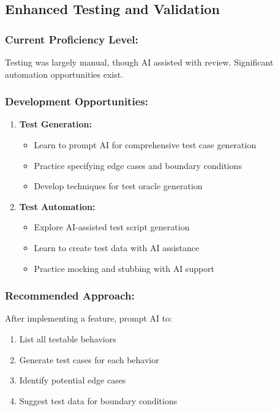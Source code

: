 \documentclass[12pt,a4paper]{article}
\begin{document}
\subsection{Enhanced Testing and Validation}

\subsubsection*{Current Proficiency Level:}
Testing was largely manual, though AI assisted with review. Significant automation opportunities exist.

\subsubsection*{Development Opportunities:}

\begin{enumerate}
    \item \textbf{Test Generation:}
    \begin{itemize}
        \item Learn to prompt AI for comprehensive test case generation
        \item Practice specifying edge cases and boundary conditions
        \item Develop techniques for test oracle generation
    \end{itemize}
    
    \item \textbf{Test Automation:}
    \begin{itemize}
        \item Explore AI-assisted test script generation
        \item Learn to create test data with AI assistance
        \item Practice mocking and stubbing with AI support
    \end{itemize}
\end{enumerate}

\subsubsection*{Recommended Approach:}

After implementing a feature, prompt AI to:
\begin{enumerate}
    \item List all testable behaviors
    \item Generate test cases for each behavior
    \item Identify potential edge cases
    \item Suggest test data for boundary conditions
\end{enumerate}
\end{document}
